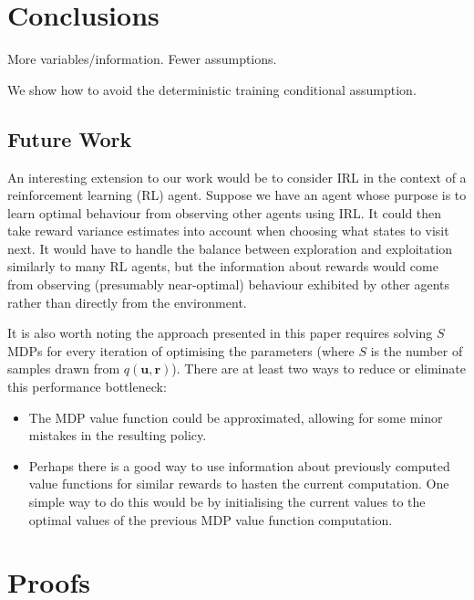 \documentclass{mpaper}
\newcommand{\approximation}{q(\mathbf{u}, \mathbf{r})}
\begin{document}
\section{Conclusions}

More variables/information. Fewer assumptions.

We show how to avoid the deterministic training conditional assumption.

\subsection{Future Work}

An interesting extension to our work would be to consider IRL in the context
of a reinforcement learning (RL) agent. Suppose we have an agent whose purpose
is to learn optimal behaviour from observing other agents using IRL. It could
then take reward variance estimates into account when choosing what states to
visit next. It would have to handle the balance between exploration and
exploitation similarly to many RL agents, but the information about rewards
would come from observing (presumably near-optimal) behaviour exhibited by other
agents rather than directly from the environment.

It is also worth noting the approach presented in this paper requires solving
$S$ MDPs for every iteration of optimising the parameters (where $S$ is the
number of samples drawn from $\approximation$). There are at least two ways to
reduce or eliminate this performance bottleneck:
\begin{itemize}
\item The MDP value function could be approximated, allowing for some minor
  mistakes in the resulting policy.
\item Perhaps there is a good way to use information about previously computed
  value functions for similar rewards to hasten the current computation. One
  simple way to do this would be by initialising the current values to the
  optimal values of the previous MDP value function computation.
\end{itemize}




\appendix
\section{Proofs} \label{appendix:proofs}
\end{document}
